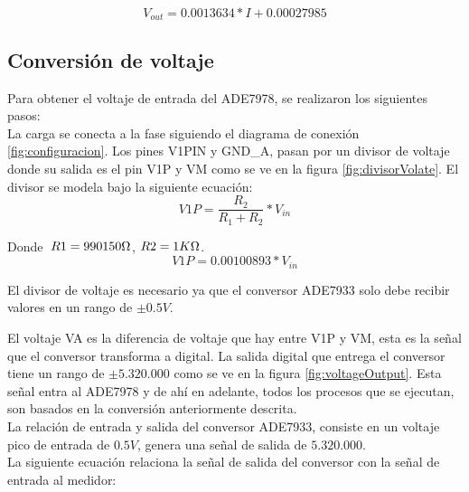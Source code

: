             \begin{equation}\label{crt ShuntC}
                V_{out} = 0.0013634*I + 0.00027985 
            \end{equation}

    \subsection{Conversión de voltaje}
        Para obtener el voltaje de entrada del ADE7978, se realizaron los siguientes pasos:\\

        La carga se conecta a la fase siguiendo el diagrama de conexión \ref{fig:configuracion}. Los pines V1PIN y GND\_A, pasan por un divisor de voltaje donde su salida es el pin V1P y VM como se ve en la figura \ref{fig:divisorVolate}. El divisor se modela bajo la siguiente ecuación:\\

        \begin{equation}
            V1P = \frac{R_{2}}{R_{1} + R_{2}} * V_{in}
        \end{equation}

        Donde $\; R1 = 990150 \ohm$, \;$R2 = 1 K\ohm$.\\

        \begin{equation}\label{divisorVoltaje}
            V1P = 0.00100893 * V_{in}
        \end{equation}

        El divisor de voltaje es necesario ya que el conversor ADE7933 solo debe recibir valores en un rango de $\pm 0.5V$. 

        El voltaje VA es la diferencia de voltaje que hay entre V1P y VM, esta es la señal que el conversor transforma a digital. La salida digital que entrega el conversor tiene un rango de $\pm 5.320.000$ como se ve en la figura \ref{fig:voltageOutput}. Esta señal entra al ADE7978 y de ahí en adelante, todos los procesos que se ejecutan, son basados en la conversión anteriormente descrita.\\

        La relación de entrada y salida del conversor ADE7933, consiste en un voltaje pico de entrada de $0.5 V$, genera una señal de salida de $5.320.000$.\\

        La siguiente ecuación relaciona la señal de salida del conversor con la señal de entrada al medidor:\\

